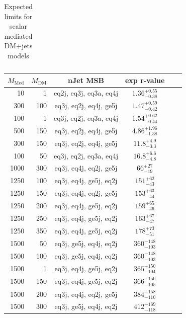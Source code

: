 \begin{table}
\begin{tabular}{rrcccc}
    \hline\hline
  \end{tabular}
  \caption{Expected limits for scalar mediated DM+jets models}
  \label{tab:DMS_exp}
\end{table}


\begin{table}
  \centering
  \begin{tabular}{rrcccc}
    \hline\hline
    $M_{\text{Med}}$ & $M_{\text{DM}}$ & nJet MSB & exp r-value\\
    \hline
   10 &   1 & eq2j, eq3j, eq3a, eq4j & $1.36_{-0.38}^{+0.55}$ \\
  300 & 100 & eq3j, eq2j, eq4j, ge5j & $1.47_{-0.42}^{+0.59}$ \\
  100 &   1 & eq3j, eq2j, eq3a, eq4j & $1.54_{-0.44}^{+0.62}$ \\
  500 & 150 & eq3j, eq2j, eq4j, ge5j & $4.86_{-1.38}^{+1.96}$ \\
  300 & 150 & eq3j, eq2j, eq4j, ge5j & $11.8_{-3.3}^{+4.9}$ \\
  100 &  50 & eq3j, eq2j, eq3a, eq4j & $16.8_{-4.8}^{+6.6}$ \\
 1000 & 300 & eq3j, eq4j, eq2j, ge5j & $66_{-19}^{+27}$ \\
 1250 & 100 & eq3j, eq4j, ge5j, eq2j & $151_{-43}^{+62}$ \\
 1250 & 150 & eq3j, eq4j, eq2j, ge5j & $153_{-44}^{+63}$ \\
 1250 & 200 & eq3j, eq4j, ge5j, eq2j & $159_{-46}^{+65}$ \\
 1250 & 250 & eq3j, eq4j, ge5j, eq2j & $163_{-47}^{+67}$ \\
 1250 & 350 & eq3j, eq4j, ge5j, eq2j & $178_{-51}^{+73}$ \\
 1500 &  50 & eq3j, ge5j, eq4j, eq2j & $360_{-103}^{+148}$ \\
 1500 & 100 & eq3j, ge5j, eq4j, eq2j & $360_{-103}^{+148}$ \\
 1500 &   1 & eq3j, eq4j, ge5j, eq2j & $365_{-104}^{+150}$ \\
 1500 & 150 & eq3j, eq4j, ge5j, eq2j & $366_{-105}^{+150}$ \\
 1500 & 200 & eq3j, eq4j, eq2j, ge5j & $384_{-110}^{+158}$ \\
 1500 & 300 & eq3j, ge5j, eq4j, eq2j & $412_{-118}^{+169}$ \\


\end{tabular}
\end{table}
